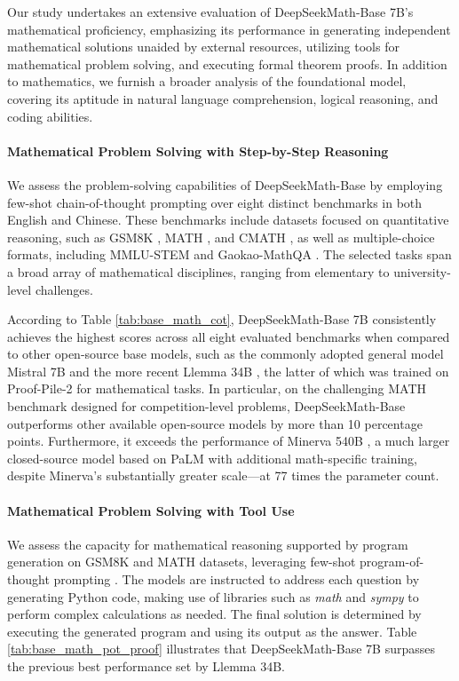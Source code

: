 \begin{itemize}[topsep=0pt]
Our study undertakes an extensive evaluation of DeepSeekMath-Base 7B's mathematical proficiency, emphasizing its performance in generating independent mathematical solutions unaided by external resources, utilizing tools for mathematical problem solving, and executing formal theorem proofs. In addition to mathematics, we furnish a broader analysis of the foundational model, covering its aptitude in natural language comprehension, logical reasoning, and coding abilities.

\paragraph{Mathematical Problem Solving with Step-by-Step Reasoning}

We assess the problem-solving capabilities of DeepSeekMath-Base by employing few-shot chain-of-thought prompting \citep{cot} over eight distinct benchmarks in both English and Chinese. These benchmarks include datasets focused on quantitative reasoning, such as GSM8K \citep{gsm8k}, MATH \citep{MATH}, and CMATH \citep{wei2023cmath}, as well as multiple-choice formats, including MMLU-STEM \citep{mmlu} and Gaokao-MathQA \citep{agieval}. The selected tasks span a broad array of mathematical disciplines, ranging from elementary to university-level challenges.

According to Table \ref{tab:base_math_cot}, DeepSeekMath-Base 7B consistently achieves the highest scores across all eight evaluated benchmarks when compared to other open-source base models, such as the commonly adopted general model Mistral 7B \citep{mistral} and the more recent Llemma 34B \citep{llemma}, the latter of which was trained on Proof-Pile-2 \citep{llemma} for mathematical tasks. In particular, on the challenging MATH benchmark designed for competition-level problems, DeepSeekMath-Base outperforms other available open-source models by more than 10 percentage points. Furthermore, it exceeds the performance of Minerva 540B \citep{minerva}, a much larger closed-source model based on PaLM \citep{palm} with additional math-specific training, despite Minerva's substantially greater scale—at 77 times the parameter count.

\paragraph{Mathematical Problem Solving with Tool Use} We assess the capacity for mathematical reasoning supported by program generation on GSM8K and MATH datasets, leveraging few-shot program-of-thought prompting \citep{pot,pal}. The models are instructed to address each question by generating Python code, making use of libraries such as \textit{math} and \textit{sympy} to perform complex calculations as needed. The final solution is determined by executing the generated program and using its output as the answer. Table \ref{tab:base_math_pot_proof} illustrates that DeepSeekMath-Base 7B surpasses the previous best performance set by Llemma 34B.


\end{itemize}
